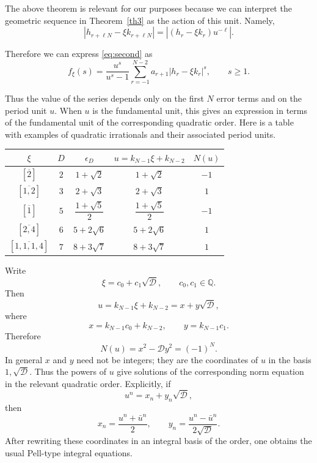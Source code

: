\documentclass[]{interact}
\theoremstyle{plain}
\numberwithin{equation}{section} %
\numberwithin{table}{section} %
\numberwithin{figure}{section}
\begin{document}
The above theorem is relevant for our purposes because we can interpret the
geometric sequence in Theorem~\ref{th3} as the action of this unit. Namely,
\[
|h_{r+\ell N}-\xi k_{r+\ell N}|
=
|(h_r-\xi k_r)u^{-\ell}|.
\]


Therefore we can express \eqref{eq:second} as
\[
f_{\xi}(s)
=
\frac{u^s}{u^s-1}
\sum_{r=-1}^{N-2}a_{r+1}|h_r-\xi k_r|^s,
\qquad s\ge1.
\]

Thus the value of the series depends only on the first \(N\) error terms and on
the period unit \(u\). When \(u\) is the fundamental unit, this gives an expression
in terms of the fundamental unit of the corresponding quadratic order. Here is a
table with examples of quadratic irrationals and their associated period units.

\begin{center}
\renewcommand{\arraystretch}{1.5}
\begin{tabular}{|c|c|c|c|c|}
\hline
$\xi$ & $D$ & $\epsilon_D$ & $u=k_{N-1}\xi+k_{N-2}$ & $N(u)$ \\
\hline
$[\overline{2}]$ 
& $2$ 
& $1+\sqrt{2}$ 
& $1+\sqrt{2}$ 
& $-1$ \\
\hline
$[\overline{1, 2}]$ 
& $3$ 
& $2+\sqrt{3}$ 
& $2+\sqrt{3}$ 
& $1$ \\
\hline
$[\overline{1}]$ 
& $5$ 
& $\dfrac{1+\sqrt{5}}{2}$ 
& $\dfrac{1+\sqrt{5}}{2}$ 
& $-1$ \\
\hline
$[\overline{2, 4}]$ 
& $6$ 
& $5+2\sqrt{6}$ 
& $5+2\sqrt{6}$ 
& $1$ \\
\hline
$[\overline{1, 1, 1, 4}]$ 
& $7$ 
& $8+3\sqrt{7}$ 
& $8+3\sqrt{7}$ 
& $1$ \\
\hline
\end{tabular}
\end{center}

Write
\[
\xi=c_0+c_1\sqrt{\mathcal D},
\qquad c_0,c_1\in\mathbb Q.
\]
Then
\[
u=k_{N-1}\xi+k_{N-2}
=
x+y\sqrt{\mathcal D},
\]
where
\[
x=k_{N-1}c_0+k_{N-2},
\qquad
y=k_{N-1}c_1.
\]
Therefore
\[
N(u)=x^2-\mathcal D y^2=(-1)^N.
\]
In general \(x\) and \(y\) need not be integers; they are the coordinates of
\(u\) in the basis \(1,\sqrt{\mathcal D}\). Thus the powers of \(u\) give
solutions of the corresponding norm equation in the relevant quadratic order.
Explicitly, if
\[
u^n=x_n+y_n\sqrt{\mathcal D},
\]
then
\[
x_n=\frac{u^n+\bar u^n}{2},
\qquad
y_n=\frac{u^n-\bar u^n}{2\sqrt{\mathcal D}}.
\]
After rewriting these coordinates in an integral basis of the order, one obtains
the usual Pell-type integral equations.
\end{document}

